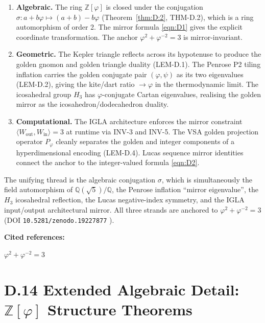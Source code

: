\begin{enumerate}
  \item \textbf{Algebraic.}  The ring $\mathbb{Z}[\varphi]$ is closed under the
    conjugation $\sigma: a+b\varphi \mapsto (a+b)-b\varphi$
    (Theorem~\ref{thm:D:2}, THM-D.2), which is a ring automorphism of order 2.
    The mirror formula \eqref{eqn:D1} gives the explicit coordinate transformation.
    The anchor $\varphi^2+\varphi^{-2}=3$ is mirror-invariant.

  \item \textbf{Geometric.}  The Kepler triangle reflects across its hypotenuse
    to produce the golden gnomon and golden triangle duality (LEM-D.1).
    The Penrose P2 tiling inflation carries the golden conjugate pair
    $(\varphi, \psi)$ as its two eigenvalues (LEM-D.2), giving the kite/dart
    ratio $\to \varphi$ in the thermodynamic limit.
    The icosahedral group $H_3$ has $\varphi$-conjugate Cartan eigenvalues,
    realising the golden mirror as the icosahedron/dodecahedron duality.

  \item \textbf{Computational.}  The IGLA architecture enforces the mirror
    constraint $\langle W_\mathrm{out},W_\mathrm{in}\rangle = 3$ at runtime
    via INV-3 and INV-5.  The VSA golden projection operator $P_\varphi$
    cleanly separates the golden and integer components of a hyperdimensional
    encoding (LEM-D.4).  Lucas sequence mirror identities connect the anchor
    to the integer-valued formula \eqref{eqn:D2}.
\end{enumerate}

The unifying thread is the algebraic conjugation $\sigma$, which is simultaneously
the field automorphism of $\mathbb{Q}(\sqrt5)/\mathbb{Q}$, the Penrose inflation
``mirror eigenvalue'', the $H_3$ icosahedral reflection, the Lucas negative-index
symmetry, and the IGLA input/output architectural mirror.
All three strands are anchored to $\varphi^2+\varphi^{-2} = 3$
(DOI \texttt{10.5281/zenodo.19227877} \cite{trios_throne}).

\bigskip
\noindent\textbf{Cited references:}
\cite{coxeter_regular_polytopes}
\cite{penrose1974}
\cite{kepler_harmonices}
\cite{vajda_fib_lucas}
\cite{koshy_fib_lucas}
\cite{gayler_vsa_2003}
\cite{kanerva_hyperdimensional}
\cite{plate_hrr}
\cite{ballot2023lucas}
\cite{trios_throne}

\(\varphi^2 + \varphi^{-2} = 3\)

\section*{D.14  Extended Algebraic Detail: $\mathbb{Z}[\varphi]$ Structure Theorems}

